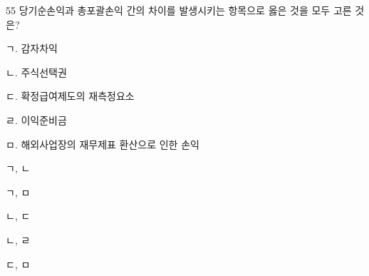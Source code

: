 \begin{question}{55}
당기순손익과 총포괄손익 간의 차이를 발생시키는 항목으로 옳은 것을 모두 고른 것은?
\begin{framedtext}
ㄱ. 감자차익 \par
ㄴ. 주식선택권 \par
ㄷ. 확정급여제도의 재측정요소 \par
ㄹ. 이익준비금 \par
ㅁ. 해외사업장의 재무제표 환산으로 인한 손익 \par
\end{framedtext}
\begin{choices}
  \item ㄱ, ㄴ
  \item ㄱ, ㅁ
  \item ㄴ, ㄷ
  \item ㄴ, ㄹ
  \item ㄷ, ㅁ
\end{choices}
\end{question}
